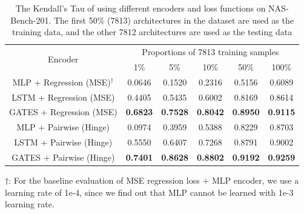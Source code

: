 \documentclass[runningheads]{llncs}
\begin{document}
\addtolength{\tabcolsep}{1pt}
\begin{table}[tb]
  \vspace{-5pt}
\caption{The Kendall’s Tau of using different encoders and loss functions on NAS-Bench-201. The first 50\% (7813) architectures in the dataset are used as the training data, and the other 7812 architectures are used as the testing data}
\label{table:gates-nb201}
\begin{center}

\begin{tabular}{cccccc}
\toprule
\multirow{2}{*}{Encoder} & \multicolumn{5}{c}{Proportions of 7813 training samples}\\ 
\cmidrule(lr){2-6} & 1\% & 5\% & 10\% & 50\% & 100\% \\\midrule
MLP + Regression (MSE)$^\dagger$ & 0.0646 & 0.1520 & 0.2316 & 0.5156 & 0.6089  \\
LSTM + Regression (MSE) & 0.4405 & 0.5435 & 0.6002 & 0.8169 & 0.8614\\
GATES + Regression (MSE) & {\bf 0.6823} & {\bf 0.7528} & {\bf 0.8042} & {\bf 0.8950} & {\bf 0.9115}\\\hline
MLP + Pairwise (Hinge)  &  0.0974 & 0.3959 & 0.5388 & 0.8229 & 0.8703\\
LSTM + Pairwise (Hinge) & 0.5550 & 0.6407 & 0.7268 & 0.8791 & 0.9002\\
  GATES + Pairwise (Hinge) & {\bf 0.7401} & {\bf 0.8628} & {\bf 0.8802} & {\bf 0.9192} & {\bf 0.9259}\\\bottomrule

\end{tabular}
\begin{minipage}{1.0\textwidth}
{\small
$\dagger$: For the baseline evaluation of MSE regression loss + MLP encoder, we use a learning rate of 1e-4, since we find out that MLP cannot be learned with 1e-3 learning rate.%
}
\end{minipage}
\end{center}
\vspace{-5pt}
\end{table}
\addtolength{\tabcolsep}{-1pt}
\end{document}

